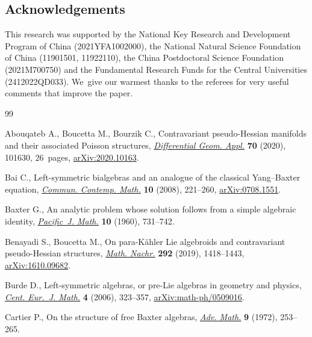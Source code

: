 \documentclass[pdftex]{sigma}%
\numberwithin{equation}{section}
\begin{document}
\subsection*{Acknowledgements}

This research was supported by the National Key Research and Development Program of China (2021YFA1002000), the National Natural Science Foundation of China (11901501, 11922110), the China Postdoctoral Science Foundation (2021M700750) and the Fundamental Research Funds for the Central Universities (2412022QD033). We~give our warmest thanks to the referees for very useful comments that improve the paper.\vspace{-1ex}

\begin{thebibliography}{99}
\footnotesize\itemsep=-0.75pt

Abouqateb A., Boucetta M., Bourzik C., Contravariant pseudo-{H}essian manifolds
 and their associated {P}oisson structures, \href{https://doi.org/10.1016/j.difgeo.2020.101630}{\textit{Differential Geom. Appl.}}
 \textbf{70} (2020), 101630, 26~pages, \href{https://arxiv.org/abs/2020.10163}{arXiv:2020.10163}.

Bai C., Left-symmetric bialgebras and an analogue of the classical
 {Y}ang--{B}axter equation, \href{https://doi.org/10.1142/S0219199708002752}{\textit{Commun. Contemp. Math.}} \textbf{10}
 (2008), 221--260, \href{https://arxiv.org/abs/0708.1551}{arXiv:0708.1551}.

Baxter G., An analytic problem whose solution follows from a simple algebraic
 identity, \href{https://doi.org/10.2140/pjm.1960.10.731}{\textit{Pacific~J. Math.}} \textbf{10} (1960), 731--742.

Benayadi S., Boucetta M., On para-{K}\"{a}hler {L}ie algebroids and
 contravariant pseudo-{H}essian structures, \href{https://doi.org/10.1002/mana.201700137}{\textit{Math. Nachr.}} \textbf{292}
 (2019), 1418--1443, \href{https://arxiv.org/abs/1610.09682}{arXiv:1610.09682}.

Burde D., Left-symmetric algebras, or pre-{L}ie algebras in geometry and
 physics, \href{https://doi.org/10.2478/s11533-006-0014-9}{\textit{Cent. Eur.~J. Math.}} \textbf{4} (2006), 323--357,
 \href{https://arxiv.org/abs/math-ph/0509016}{arXiv:math-ph/0509016}.

Cartier P., On the structure of free {B}axter algebras, \href{https://doi.org/10.1016/0001-8708(72)90018-7}{\textit{Adv. Math.}}
 \textbf{9} (1972), 253--265.


\end{thebibliography}
\end{document}
